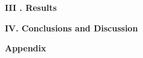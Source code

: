   



\bigskip
\bigskip
{\centering\textbf{\Large III . Results}\\[0.5cm]}

\bigskip
  
\newpage
\bigskip
{\centering\textbf{\Large IV. Conclusions and Discussion}\\[0.5cm]}

  


\newpage
{\centering\textbf{\Large Appendix}\\[0.5cm]}


